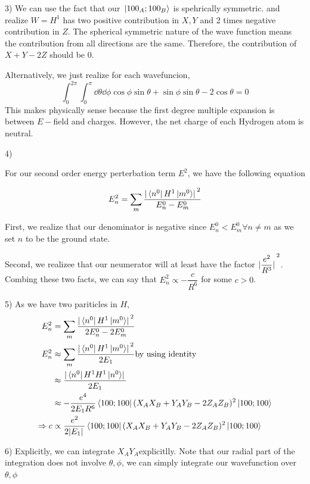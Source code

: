 \documentclass[10pt]{article}
\begin{document}
3) 
	We can use the fact that our $\ket*{100_A ; 100_B}$ is spehrically symmetric. and realize $W=H^1$ has two positive contribution in $X,Y$ and 2 times negative contribution in $Z$. The spherical symmetric nature of the wave function means the contribution from all directions are the same. Therefore, the contribution of $X+Y-2Z$ should be 0.

	Alternatively, we just realize for each wavefuncion,
	\begin{equation}
		\int_{0}^{2\pi} \int_{0}^{\pi} \dd \theta \dd \phi \cos \phi \sin \theta + \sin \phi \sin \theta - 2 \cos \theta = 0
	\end{equation}
	This makes physically sense because the first degree multiple expansion is between $E-$field and charges. However, the net charge of each Hydrogen atom is neutral.


4)

	For our second order energy perterbation term $E^2$, we have the following equation 

	\begin{equation}
		E^2_n = \sum_m \dfrac{\abs*{\bra*{n^0} H^1 \ket*{m^0}}^2}{E_n^0 - E_m^0}
	\end{equation}

	First, we realize that our denominator is negative since $E_n^0 < E_m^0 \forall n \neq m$ as we set $n$ to be the ground state.

	Second, we realizee that our neumerator will at least have the factor $\abs*{\dfrac{e^2}{R^3}} ^2$. Combing these two facts, we can say that $E_n^2 \propto -\dfrac{c}{R^6}$ for some $c > 0$.

5) 
	As we have two pariticles in $H$, 
	\begin{align*}
		E^2_n & = \sum_m \dfrac{\abs*{\bra*{n^0} H^1 \ket*{m^0}}^2}{2E_n^0 - 2E_m^0} \\
		 E^2_n & \approx \sum_m \dfrac{\abs*{\bra*{n^0} H^1 \ket*{m^0}}^2}{2E_1} \text{by using identity} \\
		 & \approx  \dfrac{\abs*{\bra*{n^0} {H^1} {H^1} \ket*{n^0}}}{2E_1} \\
		 &\approx -\dfrac{e^4}{2E_1 R^6} \bra*{100;100} (X_A X_B + Y_A Y_B -2Z_AZ_B)^2 \ket*{100;100} \\
		 \Rightarrow c &\propto \dfrac{e^2}{2\abs*{E_1}} \bra*{100;100} (X_A X_B + Y_A Y_B -2Z_AZ_B)^2 \ket*{100;100}
	\end{align*}

6) 
	Explicitly, we can integrate $X_A Y_A$explicitlly. Note that our radial part of the integration does not involve $\theta ,\phi$, we can simply integrate our wavefunction over $\theta ,\phi$
\end{document}

